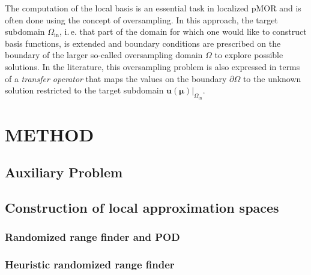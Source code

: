\documentclass[a4paper]{eccomas_paper-2024}
\makeatletter
\newcommand{\ie}{i.\,e.\@\xspace}
\makeatother
\begin{document}
The computation of the local basis is an essential task in localized pMOR and is often done using the concept of oversampling.
In this approach, the target subdomain $\varOmega_{\mathrm{in}}$, \ie{} that part of the domain for which one would like to construct basis functions, is extended and boundary conditions are prescribed on the boundary of the larger so-called oversampling domain $\varOmega$ to explore possible solutions.
In the literature, this oversampling problem is also expressed in terms of a \textit{transfer operator} that maps the values on the boundary $\partial\varOmega$ to the unknown solution restricted to the target subdomain $\bm{u}(\bm{\mu})\vert_{\varOmega_{\mathrm{in}}}$.


\section{METHOD}%
\label{sec:method}

\subsection{Auxiliary Problem} %
\label{sub:Auxiliary Problem}


\subsection{Construction of local approximation spaces} %
\label{sub:Construction of local approximation spaces}


\subsubsection{Randomized range finder and POD} %
\label{sec:Randomized range finder and POD}


\subsubsection{Heuristic randomized range finder} %
\label{sec:Heuristic randomized range finder}

\end{document}
